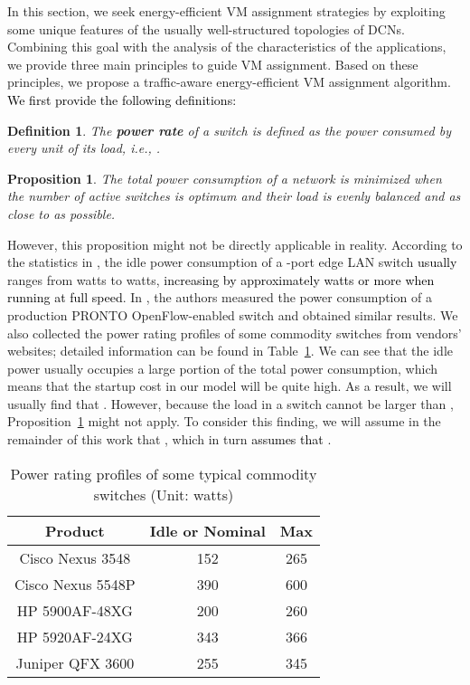 \documentclass[journal,single-space,two column,twoside,10pt]{IEEEtran}
\newtheorem{proposition}{Proposition}
\newtheorem{definition}{Definition}
\begin{document}
In this section, we seek energy-efficient VM assignment strategies by exploiting some unique features of the usually well-structured topologies of DCNs. Combining this goal with the analysis of the characteristics of the applications, we provide three main principles to guide VM assignment. Based on these principles, we propose a traffic-aware energy-efficient VM assignment algorithm. \textcolor{black}{We first provide the following definitions:}

\begin{definition}
The \textbf{power rate} of a switch is defined as the power consumed by every unit of its load, i.e.,  .
\end{definition}

\begin{proposition}
\label{prop:opt_load}
The total power consumption of a network is minimized when the number of active switches is optimum and their load is evenly balanced and as close to  as possible.
\end{proposition}

However, this proposition might not be directly applicable in reality. According to the statistics in \cite{Mahadevan_Sharma-2009}, the idle power consumption of a -port edge LAN switch \textcolor{black}{usually} ranges from  watts to  watts, \textcolor{black}{increasing by approximately  watts or more when running at full speed}. In \cite{Wang_Yao-2012}, the authors measured the power consumption of a production PRONTO  OpenFlow-enabled switch and obtained similar results. We also collected the power rating profiles of some commodity switches from vendors' websites; detailed information can be found in Table~\ref{tab:power}. We can see that the idle power usually occupies a large portion of the total power consumption, which means that the startup cost  in our model will be quite high. As a result, we will usually find that . However, because the load in a switch cannot be larger than , Proposition~\ref{prop:opt_load} might not apply. To consider this finding, we will assume in the remainder of this work that , which in turn \textcolor{black}{assumes that} .

\begin{table}[t]
\caption{\label{tab:power} Power rating profiles of some typical commodity switches (Unit: watts)}
\centering
\begin{tabular}{|c|c|c|}
	\hline
	\textbf{Product} & \textbf{Idle or Nominal} & \textbf{Max} \\
	\hline
	Cisco Nexus 3548 & 152 & 265 \\
	\hline
	Cisco Nexus 5548P & 390 & 600 \\
	\hline
	HP 5900AF-48XG & 200 & 260 \\
	\hline
	HP 5920AF-24XG & 343 & 366 \\
	\hline
	Juniper QFX 3600 & 255 & 345 \\
	\hline
\end{tabular}
\end{table}
\end{document}
